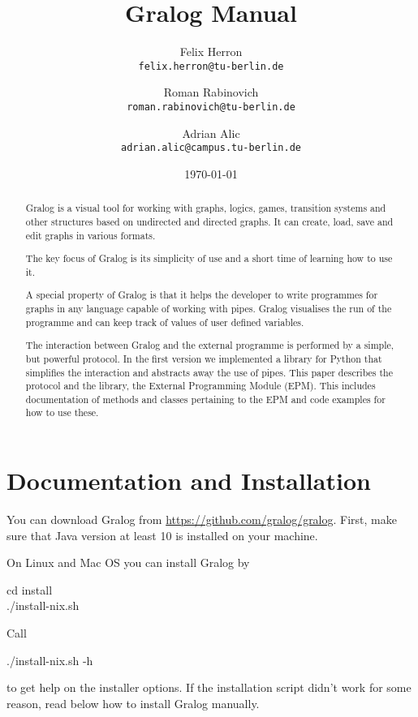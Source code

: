 \documentclass{article}
\title{Gralog Manual}
\author{Felix Herron\\\texttt{felix.herron@tu-berlin.de}
  \and Roman Rabinovich\\ \texttt{roman.rabinovich@tu-berlin.de}
\and Adrian Alic\\ \texttt{adrian.alic@campus.tu-berlin.de}}
\date{\today}
\newcounter{example}
\begin{document}
\maketitle

\tableofcontents

\begin{abstract}
Gralog is a visual tool for working with graphs, logics, games,
transition systems and other structures based on undirected and
directed graphs. It can create, load, save and edit graphs in
various formats.

The key focus of Gralog is its simplicity of use and a short time of
learning how to use it.

A special property of Gralog is that it helps the developer to write
programmes for graphs in any language capable of working with
pipes. Gralog visualises the run of the programme and can keep track
of values of user defined variables.

The interaction between Gralog and the external programme is
performed by a simple, but powerful protocol. In the first version
we implemented a library for Python that simplifies the interaction
and abstracts away the use of pipes. This paper describes the
protocol and the library, the External Programming Module (EPM). This
includes documentation of methods and classes pertaining to the
EPM and code examples for how to use these.
\end{abstract}

\section{Documentation and Installation}

You can download Gralog from \url{https://github.com/gralog/gralog}.
First, make sure that Java version at least 10 is installed on your
machine.

On Linux and Mac OS you can install Gralog by
\\\begin{tcolorbox}
  cd install\\
  ./install-nix.sh
\end{tcolorbox}

Call
\\\begin{tcolorbox}
  ./install-nix.sh -h
\end{tcolorbox}
to get help on the installer options. If the installation script
didn't work for some reason, read below how to install Gralog manually.
\end{document}
